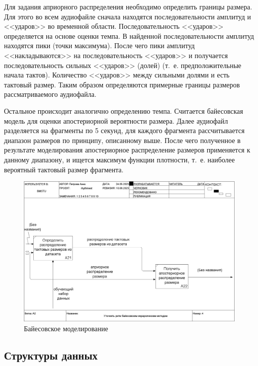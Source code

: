\newpage

Для задания априорного распределения необходимо определить границы размера. Для этого во всем аудиофайле сначала находятся последовательности амплитуд и <<ударов>> во временной области. Последовательность <<ударов>> определяется на основе оценки темпа. В найденной последовательности амплитуд находятся пики (точки максимума). После чего пики амплитуд <<накладываются>> на последовательность <<ударов>> и получается последовательность сильных <<ударов>> (долей) (т.~е. предположительные начала тактов). Количество <<ударов>> между сильными долями и есть тактовый размер. Таким образом определяются примерные границы размеров рассматриваемого аудиофайла.

Остальное происходит аналогично определению темпа. Считается байесовская модель для оценки апостериорной вероятности размера. Далее аудиофайл разделяется на фрагменты по 5 секунд, для каждого фрагмента рассчитывается диапазон размеров по принципу, описанному выше. После чего полученное в результате моделирования апостериорное распределение размеров применяется к данному диапазону, и ищется максимум функции плотности, т.~е. наиболее вероятный тактовый размер фрагмента.

\begin{figure}[h]
	\centering
	\includegraphics[scale=0.25]{inc/img/rhythm_idef/04_A2.png}
	\caption{Байесовское моделирование}
	\label{img:rhythm_3}
\end{figure}

\clearpage

\subsection{Структуры данных}

